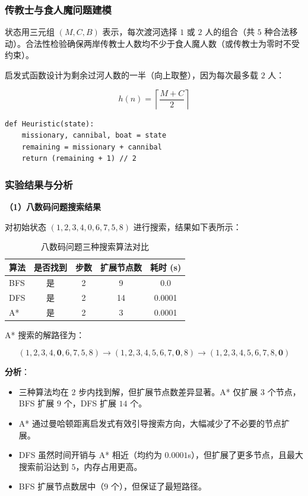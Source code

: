\documentclass[UTF8]{ctexart}
\begin{document}
\subsubsection{传教士与食人魔问题建模}

状态用三元组 $(M, C, B)$ 表示，每次渡河选择 $1$ 或 $2$ 人的组合（共 $5$ 种合法移动）。合法性检验确保两岸传教士人数均不少于食人魔人数（或传教士为零时不受约束）。

启发式函数设计为剩余过河人数的一半（向上取整），因为每次最多载 $2$ 人：

\[
h(n) = \left\lceil \frac{M + C}{2} \right\rceil
\]

\begin{lstlisting}[caption={传教士与食人魔问题启发式函数}]
def Heuristic(state):
    missionary, cannibal, boat = state
    remaining = missionary + cannibal
    return (remaining + 1) // 2
\end{lstlisting}

\subsubsection{实验结果与分析}

\textbf{（1）八数码问题搜索结果}

对初始状态 $(1,2,3,4,0,6,7,5,8)$ 进行搜索，结果如下表所示：

\begin{table}[htbp]
\centering
\caption{八数码问题三种搜索算法对比}
\begin{tabular}{lcccc}
\toprule
算法 & 是否找到 & 步数 & 扩展节点数 & 耗时 (s) \\
\midrule
BFS & 是 & 2 & 9 & 0.0 \\
DFS & 是 & 2 & 14 & 0.0001 \\
A* & 是 & 2 & 3 & 0.0001 \\
\bottomrule
\end{tabular}
\end{table}

A* 搜索的解路径为：

\[
(1,2,3,4,\mathbf{0},6,7,5,8) \rightarrow (1,2,3,4,5,6,7,\mathbf{0},8) \rightarrow (1,2,3,4,5,6,7,8,\mathbf{0})
\]

\textbf{分析}：
\begin{itemize}
  \item 三种算法均在 $2$ 步内找到解，但扩展节点数差异显著。A* 仅扩展 $3$ 个节点，BFS 扩展 $9$ 个，DFS 扩展 $14$ 个。
  \item A* 通过曼哈顿距离启发式有效引导搜索方向，大幅减少了不必要的节点扩展。
  \item DFS 虽然时间开销与 A* 相近（均约为 $0.0001$s），但扩展了更多节点，且最大搜索前沿达到 $5$，内存占用更高。
  \item BFS 扩展节点数居中（$9$ 个），但保证了最短路径。
\end{itemize}
\end{document}
